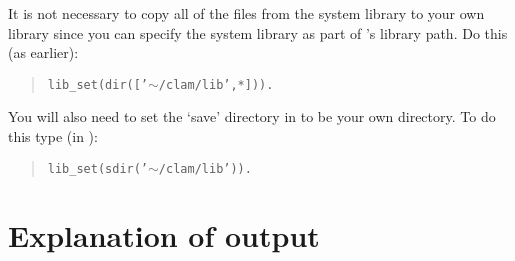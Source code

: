 \documentclass{article}
\begin{document}
It is not necessary to copy all of the files from the system library
to your own library since you can specify the system library as part
of \clam's library path.  Do this (as earlier):
%
\begin{verse}
{\tt lib\_set(dir(['$\sim$/clam/lib',*])).}
\end{verse}
%
You will also need to set the `save' directory in \clam to be your own
directory. To do this type (in \clam):
%
\begin{verse}
{\tt lib\_set(sdir('$\sim$/clam/lib')).}
\end{verse}


\section{Explanation of \clam output\label{explain}}
\end{document}
